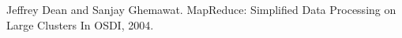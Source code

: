 \fontsize{10.5pt}{10.5pt}\selectfont
\begin{thebibliography}{10}

Jeffrey Dean and Sanjay Ghemawat.
\newblock MapReduce: Simplified Data Processing on Large Clusters
\newblock In OSDI, 2004.

\end{thebibliography}
